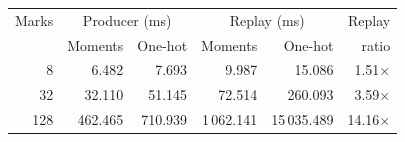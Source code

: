 \small
\begin{tabular}{rrrrrr}
\toprule
Marks & \multicolumn{2}{c}{Producer (ms)} & \multicolumn{2}{c}{Replay (ms)} & Replay\\
 & Moments & One-hot & Moments & One-hot & ratio\\
\midrule
8 & 6.482 & 7.693 & 9.987 & 15.086 & 1.51$\times$\\
32 & 32.110 & 51.145 & 72.514 & 260.093 & 3.59$\times$\\
128 & 462.465 & 710.939 & 1\,062.141 & 15\,035.489 & 14.16$\times$\\
\bottomrule
\end{tabular}
